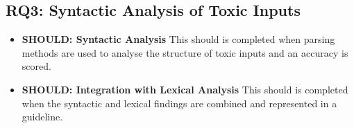 \subsection{RQ3: Syntactic Analysis of Toxic Inputs}

\begin{itemize}
    \item \textbf{SHOULD: Syntactic Analysis}
    This should is completed when parsing methods are used to analyse the structure of toxic inputs and an accuracy is scored.
    
    \item \textbf{SHOULD: Integration with Lexical Analysis}
    This should is completed when the syntactic and lexical findings are combined and represented in a guideline.
\end{itemize}

